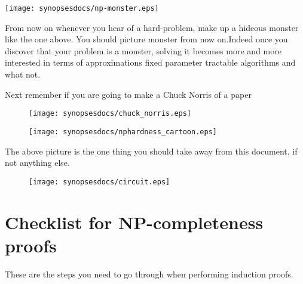 \begin{center}
\texttt{[image: synopsesdocs/np-monster.eps]}
\end{center}


From now on whenever you hear of a hard-problem, make up a hideous monster like the one above.
You should picture monster from now on.Indeed once you discover that your problem is a monster,
solving it becomes more and more interested in terms of approximations fixed parameter tractable
algorithms and what not.

Next remember if you are going to make a Chuck Norris of a paper

\begin{figure}[h]
\centering
\texttt{[image: synopsesdocs/chuck\_norris.eps]}
\end{figure}


\begin{figure}[h]
\centering
\texttt{[image: synopsesdocs/nphardness\_cartoon.eps]}
\end{figure}

The above picture is the one thing you should take away from this document, if not anything else.


\begin{figure}[h]
\centering
\texttt{[image: synopsesdocs/circuit.eps]}
\end{figure}


\section{Checklist for NP-completeness proofs}
\label{sec:org7fb4ef8}

These are the steps you need to go through when performing induction proofs. 

